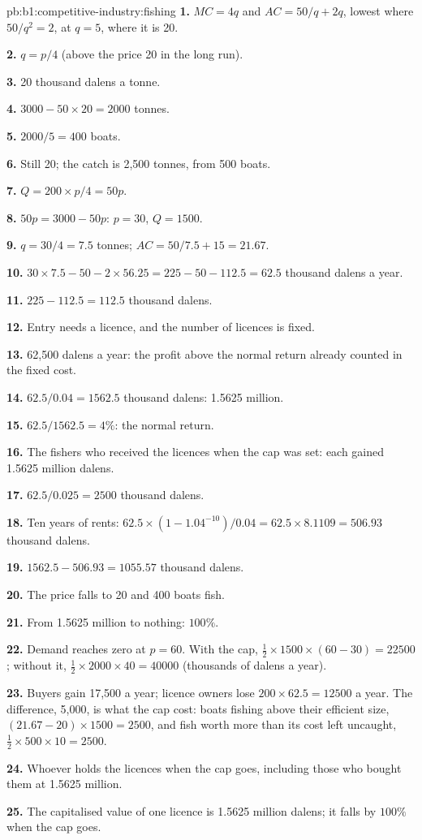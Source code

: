 \begin{solution}{pb:b1:competitive-industry:fishing}
\textbf{1.} $MC = 4q$ and $AC = 50/q + 2q$, lowest where $50/q^2 = 2$, at $q = 5$, where it is 20.

\textbf{2.} $q = p/4$ (above the price 20 in the long run).

\textbf{3.} 20 thousand dalens a tonne.

\textbf{4.} $3000 - 50 \times 20 = 2000$ tonnes.

\textbf{5.} $2000/5 = 400$ boats.

\textbf{6.} Still 20; the catch is 2,500 tonnes, from 500 boats.

\textbf{7.} $Q = 200 \times p/4 = 50p$.

\textbf{8.} $50p = 3000 - 50p$: $p = 30$, $Q = 1500$.

\textbf{9.} $q = 30/4 = 7.5$ tonnes; $AC = 50/7.5 + 15 = 21.67$.

\textbf{10.} $30 \times 7.5 - 50 - 2 \times 56.25 = 225 - 50 - 112.5 = 62.5$ thousand dalens a year.

\textbf{11.} $225 - 112.5 = 112.5$ thousand dalens.

\textbf{12.} Entry needs a licence, and the number of licences is fixed.

\textbf{13.} 62,500 dalens a year: the profit above the normal return already
counted in the fixed cost.

\textbf{14.} $62.5/0.04 = 1562.5$ thousand dalens: 1.5625 million.

\textbf{15.} $62.5/1562.5 = 4\%$: the normal return.

\textbf{16.} The fishers who received the licences when the cap was set: each
gained 1.5625 million dalens.

\textbf{17.} $62.5/0.025 = 2500$ thousand dalens.

\textbf{18.} Ten years of rents: $62.5 \times (1 - 1.04^{-10})/0.04 = 62.5 \times 8.1109 = 506.93$
thousand dalens.

\textbf{19.} $1562.5 - 506.93 = 1055.57$ thousand dalens.

\textbf{20.} The price falls to 20 and 400 boats fish.

\textbf{21.} From 1.5625 million to nothing: $100\%$.

\textbf{22.} Demand reaches zero at $p = 60$. With the cap,
$\tfrac12 \times 1500 \times (60 - 30) = 22500$; without it, $\tfrac12 \times 2000 \times 40 = 40000$ (thousands of
dalens a year).

\textbf{23.} Buyers gain 17,500 a year; licence owners lose $200 \times 62.5 = 12500$ a
year. The difference, 5,000, is what the cap cost: boats fishing above
their efficient size, $(21.67 - 20) \times 1500 = 2500$, and fish worth more than
its cost left uncaught, $\tfrac12 \times 500 \times 10 = 2500$.

\textbf{24.} Whoever holds the licences when the cap goes, including those
who bought them at 1.5625 million.

\textbf{25.} The capitalised value of one licence is 1.5625 million dalens;
it falls by $100\%$ when the cap goes.
\end{solution}
